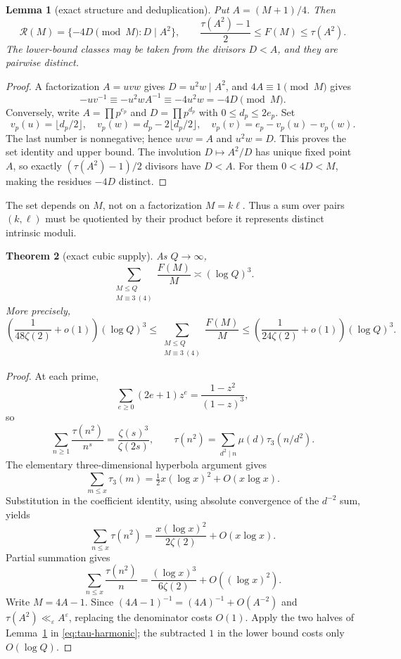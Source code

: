 \documentclass[10pt,reqno]{amsart}
\newtheorem{theorem}{Theorem}[section]
\newtheorem{lemma}[theorem]{Lemma}
\theoremstyle{definition}
\newcommand{\Rcal}{\mathscr R}
\newcommand{\1}{\mathbf 1}
\newcommand{\eps}{\varepsilon}
\begin{document}
\begin{lemma}[exact structure and deduplication]\label{lem:exact-R}
Put $A=(M+1)/4$.  Then
\begin{equation}\label{eq:exact-R}
 \Rcal(M)=\{-4D\pmod M:D\mid A^2\},
 \qquad \frac{\tau(A^2)-1}{2}\leq F(M)\leq\tau(A^2).
\end{equation}
The lower-bound classes may be taken from the divisors $D<A$, and they are pairwise distinct.
\end{lemma}
\begin{proof}
A factorization $A=uvw$ gives $D=u^2w\mid A^2$, and $4A\equiv1\pmod M$ gives
\[
 -uv^{-1}\equiv-u^2wA^{-1}\equiv-4u^2w=-4D\pmod M.
\]
Conversely, write $A=\prod p^{e_p}$ and $D=\prod p^{d_p}$ with $0\leq d_p\leq2e_p$.  Set
\[
 v_p(u)=\lfloor d_p/2\rfloor,\quad
 v_p(w)=d_p-2\lfloor d_p/2\rfloor,\quad
 v_p(v)=e_p-v_p(u)-v_p(w).
\]
The last number is nonnegative; hence $uvw=A$ and $u^2w=D$.  This proves the set identity and upper bound.  The involution $D\mapsto A^2/D$ has unique fixed point $A$, so exactly $(\tau(A^2)-1)/2$ divisors have $D<A$.  For them $0<4D<M$, making the residues $-4D$ distinct.
\end{proof}
The set depends on $M$, not on a factorization $M=k\ell$.  Thus a sum over pairs $(k,\ell)$ must be quotiented by their product before it represents distinct intrinsic moduli.

\begin{theorem}[exact cubic supply]\label{thm:cubic}
As $Q\to\infty$,
\begin{equation}\label{eq:cubic}
 \sum_{\substack{M\leq Q\\M\equiv3\ (4)}}\frac{F(M)}M\asymp(\log Q)^3.
\end{equation}
More precisely,
\[
 \left(\frac1{48\zeta(2)}+o(1)\right)(\log Q)^3
 \leq\sum_{\substack{M\leq Q\\M\equiv3\ (4)}}\frac{F(M)}M
 \leq\left(\frac1{24\zeta(2)}+o(1)\right)(\log Q)^3.
\]
\end{theorem}
\begin{proof}
At each prime,
\[
 \sum_{e\geq0}(2e+1)z^e=\frac{1-z^2}{(1-z)^3},
\]
so
\[
 \sum_{n\geq1}\frac{\tau(n^2)}{n^s}=\frac{\zeta(s)^3}{\zeta(2s)},
 \qquad
 \tau(n^2)=\sum_{d^2\mid n}\mu(d)\tau_3(n/d^2).
\]
The elementary three-dimensional hyperbola argument gives
\[
 \sum_{m\leq x}\tau_3(m)=\tfrac12x(\log x)^2+O(x\log x).
\]
Substitution in the coefficient identity, using absolute convergence of the $d^{-2}$ sum, yields
\[
 \sum_{n\leq x}\tau(n^2)=\frac{x(\log x)^2}{2\zeta(2)}+O(x\log x).
\]
Partial summation gives
\begin{equation}\label{eq:tau-harmonic}
 \sum_{n\leq x}\frac{\tau(n^2)}n
 =\frac{(\log x)^3}{6\zeta(2)}+O((\log x)^2).
\end{equation}
Write $M=4A-1$.  Since $(4A-1)^{-1}=(4A)^{-1}+O(A^{-2})$ and $\tau(A^2)\ll_\eps A^\eps$, replacing the denominator costs $O(1)$.  Apply the two halves of Lemma~\ref{lem:exact-R} in \eqref{eq:tau-harmonic}; the subtracted $1$ in the lower bound costs only $O(\log Q)$.
\end{proof}
\end{document}
